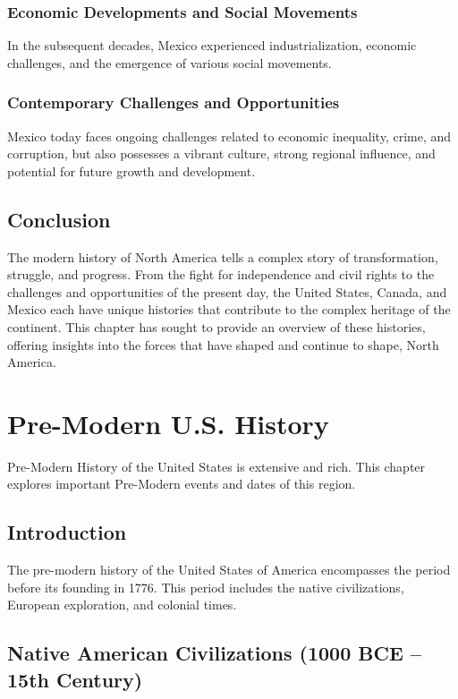 \documentclass{book}
\begin{document}
\subsection{Economic Developments and Social Movements}
In the subsequent decades, Mexico experienced industrialization, economic challenges, and the emergence of various social movements.

\subsection{Contemporary Challenges and Opportunities}
Mexico today faces ongoing challenges related to economic inequality, crime, and corruption, but also possesses a vibrant culture, strong regional influence, and potential for future growth and development.

\section{Conclusion}
\label{sec:conclusion-north-america-modern}
The modern history of North America tells a complex story of transformation, struggle, and progress. From the fight for independence and civil rights to the challenges and opportunities of the present day, the United States, Canada, and Mexico each have unique histories that contribute to the complex heritage of the continent. This chapter has sought to provide an overview of these histories, offering insights into the forces that have shaped and continue to shape, North America.

\chapter{Pre-Modern U.S. History}
\label{ch:pre-modern-us-history}

Pre-Modern History of the United States is extensive and rich. This chapter explores important Pre-Modern events and dates of this region.

\section{Introduction}
\label{sec:introduction-pre-modern-usa}
The pre-modern history of the United States of America encompasses the period before its founding in 1776. This period includes the native civilizations, European exploration, and colonial times.

\section{Native American Civilizations (1000 BCE – 15th Century)}
\label{sec:native-american-civilizations}
\end{document}
